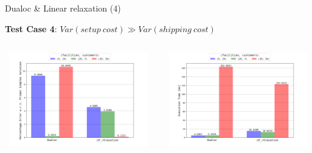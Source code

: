 \documentclass{beamer}
\begin{document}
	    \begin{frame}{Dualoc \& Linear relaxation (4)}
	    
        \textbf{Test Case 4}: $Var(setup \ cost) \gg Var(shipping \ cost)$
        
        
        \begin{columns}
	   \centering
        \includegraphics[width=6.5cm,height=4.2cm]{img/chart_error_3.png}
        
        \centering
        \includegraphics[width=6.5cm,height=4.2cm]{img/chart_time_3.png}
        \end{columns}
        
	    \end{frame}
	    
\end{document}
